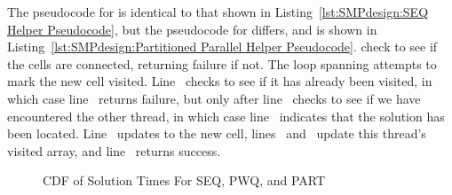 \begin{fcvref}
The pseudocode for  is identical to that shown in
Listing~\ref{lst:SMPdesign:SEQ Helper Pseudocode},
but the pseudocode for  differs, and
is shown in
Listing~\ref{lst:SMPdesign:Partitioned Parallel Helper Pseudocode}.
check to see if the cells are connected, returning failure
if not.
The loop spanning  attempts to mark
the new cell visited.
Line~ checks to see if it has already been visited, in which case
line~ returns failure, but only after line~
checks to see if
we have encountered the other thread, in which case line~ indicates
that the solution has been located.
Line~ updates to the new cell,
lines~ and~ update this thread's visited
array, and line~ returns success.
\end{fcvref}

\fi

\begin{figure}[tb]
\centering
{}
\caption{CDF of Solution Times For SEQ, PWQ, and PART}
\label{fig:SMPdesign:CDF of Solution Times For SEQ, PWQ, and PART}
\end{figure}

